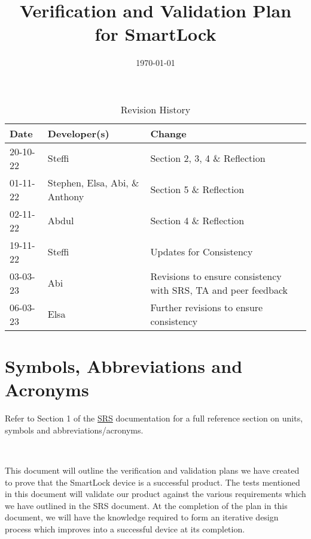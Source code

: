 \documentclass[12pt, titlepage]{article}
\title{Verification and Validation Plan for SmartLock\\\progname}
\author{\authname}
\date{\today}
\begin{document}
	


\maketitle

\newpage


\begin{table}[hp]
\caption{Revision History} \label{TblRevisionHistory}
\begin{tabularx}{\textwidth}{llX}
\toprule
\textbf{Date} & \textbf{Developer(s)} & \textbf{Change}\\
\midrule
20-10-22 & Steffi & Section 2, 3, 4 \& Reflection\\
01-11-22 & Stephen, Elsa, Abi, \& Anthony & Section 5 \& Reflection\\
02-11-22 & Abdul & Section 4 \& Reflection\\
19-11-22 & Steffi & Updates for Consistency\\
03-03-23 & Abi & Revisions to ensure consistency with SRS, TA and peer feedback\\
06-03-23 & Elsa & Further revisions to ensure consistency\\
\bottomrule
\end{tabularx}
\end{table}

\newpage

\tableofcontents

\listoftables

\listoffigures


\newpage


\section{Symbols, Abbreviations and Acronyms}

Refer to Section 1 of the \href{https://github.com/NevoAbigail/Capstone/blob/main/docs/SRS/SRS.pdf}{SRS} documentation for a full reference section on units, symbols and abbreviations/acronyms.

\-\

This document will outline the verification and validation plans we have created to prove that the SmartLock device is a successful product. The tests mentioned in this document will validate our product against the various requirements which we have outlined in the SRS document. At the completion of the plan in this document, we will have the knowledge required to form an iterative design process which improves into a successful device at its completion. 
\end{document}
